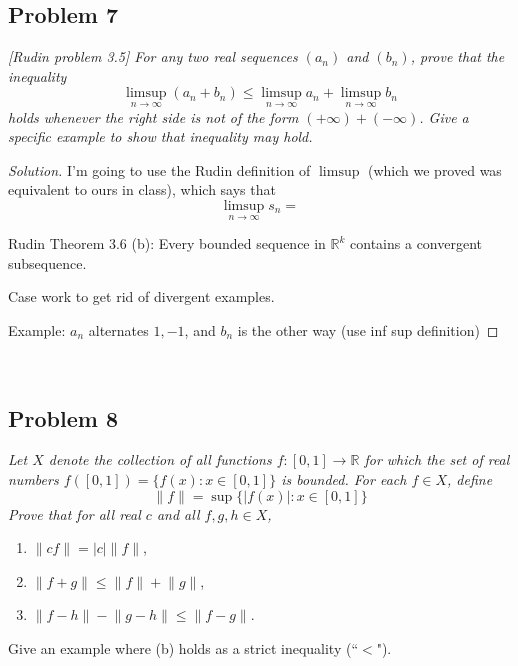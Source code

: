 \documentclass{article}
\newcommand{\R}{{\mathbb R}}
\begin{document}
\subsection*{Problem 7}
{\it [Rudin problem 3.5]
For any two real sequences $(a_n)$ and $(b_n)$, prove that the inequality
\[
	\limsup_{n\to\infty}(a_n + b_n) \leq \limsup_{n\to\infty}a_n + \limsup_{n\to\infty}b_n
\]
holds whenever the right side is not of the form $(+\infty) + (-\infty)$.
Give a specific example to show that inequality may hold.}

\begin{proof}[Solution]\let\qed\relax
	I'm going to use the Rudin definition of $\limsup$
	(which we proved was equivalent to ours in class),
	which says that
	\[
		\limsup_{n \to \infty} s_n = 
	\]
	
	Rudin Theorem 3.6 (b): Every bounded sequence in $\R^k$ contains a convergent subsequence.

	Case work to get rid of divergent examples.

	Example: $a_n$ alternates $1,-1$, and $b_n$ is the other way (use inf sup definition)
\end{proof}
\clearpage
~\clearpage

\subsection*{Problem 8}
{\it Let $X$ denote the collection of all functions $f \colon [0,1] \to \R$
for which the set of real numbers $f([0,1]) = \{f(x) \colon x \in [0,1]\}$ is bounded.
For each $f \in X$, define
\[
	\lVert f \rVert = \sup\{|f(x)| \colon x \in [0,1]\}
\]
Prove that for all real $c$ and all $f,g,h \in X$,
\begin{enumerate}
	\item $\lVert cf \rVert = |c|\lVert f \rVert$,
	\item $\lVert f + g \rVert \leq \lVert f \rVert + \lVert g \rVert$,
	\item $\lVert f - h \rVert - \lVert g - h\rVert \leq \lVert f - g\rVert$.
\end{enumerate}
Give an example where (b) holds as a strict inequality (``$<$").}
\end{document}
